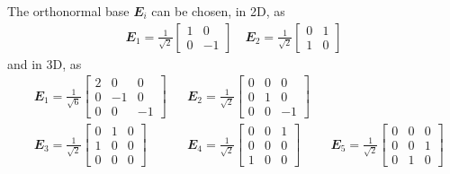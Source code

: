 \documentclass[10pt,a4paper]{article}
\renewcommand{\ts}[1]{\mathbfit{#1}}
\begin{document}
The orthonormal base $\ts E_i$ can be chosen, in 2D, as
\begin{align}
 \ts E_1 = \frac{1}{\sqrt{2}}\begin{bmatrix} 1 & 0\\ 0 & -1\end{bmatrix}\quad \ts E_2 = \frac{1}{\sqrt{2}}\begin{bmatrix} 0 & 1\\ 1 & 0\end{bmatrix}
\end{align}
and in 3D, as
\begin{align}
 &\ts E_1 = \frac{1}{\sqrt{6}}\begin{bmatrix} 2 & 0 & 0\\ 0 & -1 & 0\\ 0 & 0 & -1\end{bmatrix}
 &&\ts E_2 = \frac{1}{\sqrt{2}}\begin{bmatrix} 0 & 0 & 0\\ 0 & 1 & 0 \\ 0 & 0 & -1\end{bmatrix}
 &&\\
 &\ts E_3 = \frac{1}{\sqrt{2}}\begin{bmatrix} 0 & 1 & 0\\ 1 & 0 & 0 \\ 0 & 0 & 0\end{bmatrix}
 &&\ts E_4 = \frac{1}{\sqrt{2}}\begin{bmatrix} 0 & 0 & 1\\ 0 & 0 & 0 \\ 1 & 0 & 0\end{bmatrix}
 &&\ts E_5 = \frac{1}{\sqrt{2}}\begin{bmatrix} 0 & 0 & 0\\ 0 & 0 & 1 \\ 0 & 1 & 0\end{bmatrix}
\end{align}




\end{document}
